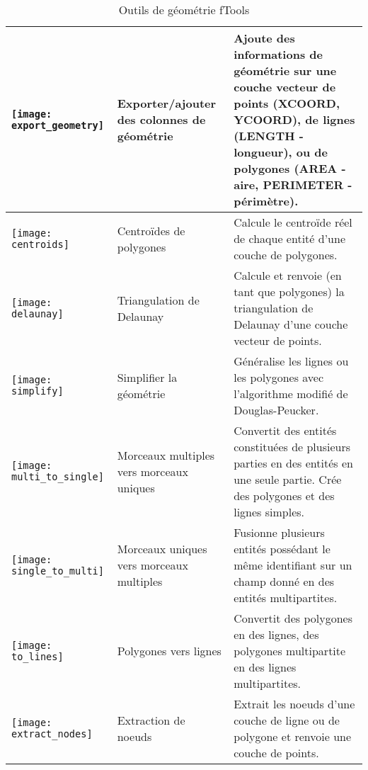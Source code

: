 \begin{table}[ht]
\begin{tabular}{|m{1cm}|m{3cm}|m{9cm}|}
 \hline \texttt{[image: export\_geometry]} & Exporter/ajouter des colonnes de géométrie & Ajoute des informations de géométrie sur une couche vecteur de points (XCOORD, YCOORD), de lignes (LENGTH - longueur), ou de polygones (AREA - aire, PERIMETER - périmètre). \\
 \hline \texttt{[image: centroids]} & Centroïdes de polygones & Calcule le centroïde réel de chaque entité d'une couche de polygones. \\
 \hline \texttt{[image: delaunay]} & Triangulation de Delaunay & Calcule et renvoie (en tant que polygones) la triangulation de Delaunay d'une couche vecteur de points. \\
 \hline \texttt{[image: simplify]} & Simplifier la géométrie & Généralise les lignes ou les polygones avec l'algorithme modifié de Douglas-Peucker. \\
 \hline \texttt{[image: multi\_to\_single]} & Morceaux multiples vers morceaux uniques & Convertit des entités constituées de plusieurs parties en des entités en une seule partie. Crée des polygones et des lignes simples. \\
 \hline \texttt{[image: single\_to\_multi]} & Morceaux uniques vers morceaux multiples & Fusionne plusieurs entités possédant le même identifiant sur un champ donné en des entités multipartites. \\
 \hline \texttt{[image: to\_lines]} & Polygones vers lignes & Convertit des polygones en des lignes, des polygones multipartite en des lignes multipartites. \\
 \hline \texttt{[image: extract\_nodes]} & Extraction de noeuds & Extrait les noeuds d'une couche de ligne ou de polygone et renvoie une couche de points. \\
 \hline
\end{tabular}
\caption{Outils de géométrie fTools}\label{tab:ftool_geometry}
\end{table}

